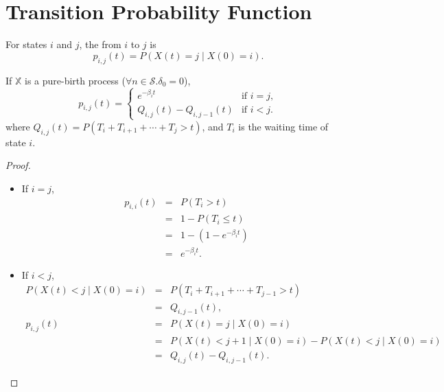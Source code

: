 \section{Transition Probability Function}

\begin{definition}
For states $ i $ and $ j $, the  from $ i $ to $ j $ is
\[ p_{i, j}(t) = P(X(t) = j \mid X(0) = i). \]
\end{definition}

\begin{lemma}
If $ \mathbb{X} $ is a pure-birth process ($ \forall n \in \mathcal{S}. \delta_{0} = 0 $),
\[ p_{i, j}(t) = \begin{cases}
e^{-\beta_{i}t}               & \text{if } i = j, \\
Q_{i, j}(t) - Q_{i, j - 1}(t) & \text{if } i < j.
\end{cases} \]
where $ Q_{i, j}(t) = P(T_{i} + T_{i + 1} + \cdots + T_{j} > t) $, and $ T_{i} $ is the waiting time of state $ i $.
\begin{proof}
\begin{itemize}
\item If $ i = j $,
\begin{eqnarray*}
p_{i, i}(t)
  & = & P(T_{i} > t) \\
  & = & 1 - P(T_{i} \le t) \\
  & = & 1 - (1 - e^{-\beta_{i}t}) \\
  & = & e^{-\beta_{i}t}.
\end{eqnarray*}

\item If $ i < j $,
\begin{eqnarray*}
P(X(t) < j \mid X(0) = i)
  & = & P(T_{i} + T_{i + 1} + \cdots + T_{j - 1} > t) \\
  & = & Q_{i, j - 1}(t), \\
p_{i, j}(t)
  & = & P(X(t) = j \mid X(0) = i) \\
  & = & P(X(t) < j + 1 \mid X(0) = i) - P(X(t) < j \mid X(0) = i) \\
  & = & Q_{i, j}(t) - Q_{i, j - 1}(t).
\end{eqnarray*}
\end{itemize}
\end{proof}
\end{lemma}

